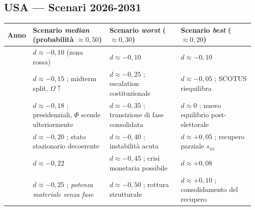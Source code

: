 \subsection{USA --- Scenari 2026-2031}\label{usa-scenari-2026-2031}

{\def\LTcaptype{none} %
{\small\begin{longtable}[]{@{}
  >{\raggedright\arraybackslash}p{}
  >{\raggedright\arraybackslash}p{}
  >{\raggedright\arraybackslash}p{}
  >{\raggedright\arraybackslash}p{}@{}}
\toprule\noalign{}
\begin{minipage}[b]{\linewidth}\raggedright
Anno
\end{minipage} & \begin{minipage}[b]{\linewidth}\raggedright
Scenario \emph{median} (probabilità \(\approx 0{,}50\))
\end{minipage} & \begin{minipage}[b]{\linewidth}\raggedright
Scenario \emph{worst} (\(\approx 0{,}30\))
\end{minipage} & \begin{minipage}[b]{\linewidth}\raggedright
Scenario \emph{best} (\(\approx 0{,}20\))
\end{minipage} \\
\midrule\noalign{}
\endhead
\bottomrule\noalign{}
\endlastfoot
2026 & \(d \approx -0{,}10\) (zona rossa) & \(d \approx -0{,}10\) &
\(d \approx -0{,}10\) \\
2027 & \(d \approx -0{,}15\) ; midterm split, \(\Omega \uparrow\) &
\(d \approx -0{,}25\) ; escalation costituzionale &
\(d \approx -0{,}05\) ; SCOTUS riequilibra \\
2028 & \(d \approx -0{,}18\) ; presidenziali, \(\Phi\) scende
ulteriormente & \(d \approx -0{,}35\) ; transizione di fase consolidata
& \(d \approx 0\) ; nuovo equilibrio post-elettorale \\
2029 & \(d \approx -0{,}20\) ; stato stazionario decoerente &
\(d \approx -0{,}40\) ; instabilità acuta & \(d \approx +0{,}05\) ;
recupero parziale \(s_{iii}\) \\
2030 & \(d \approx -0{,}22\) & \(d \approx -0{,}45\) ; crisi monetaria
possibile & \(d \approx +0{,}08\) \\
2031 & \(d \approx -0{,}25\) ; \emph{potenza materiale senza fase} &
\(d \approx -0{,}50\) ; rottura strutturale & \(d \approx +0{,}10\) ;
consolidamento del recupero \\
\end{longtable}}
}

